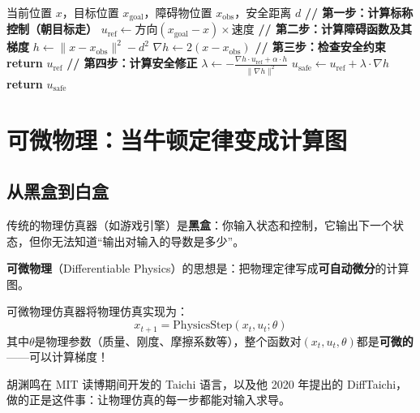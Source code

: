 \begin{algorithm}[H]
\caption{CBF安全控制器伪代码}
\begin{algorithmic}[1]
\Require 当前位置 $x$，目标位置 $x_{\text{goal}}$，障碍物位置 $x_{\text{obs}}$，安全距离 $d$
\State \textbf{// 第一步：计算标称控制（朝目标走）}
\State $u_{\text{ref}} \gets \text{方向}(x_{\text{goal}} - x) \times \text{速度}$
\State \textbf{// 第二步：计算障碍函数及其梯度}
\State $h \gets \|x - x_{\text{obs}}\|^2 - d^2$ 
\State $\nabla h \gets 2(x - x_{\text{obs}})$ 
\State \textbf{// 第三步：检查安全约束}
    \State \textbf{return} $u_{\text{ref}}$ 
\EndIf
\State \textbf{// 第四步：计算安全修正}
\State $\lambda \gets -\frac{\nabla h \cdot u_{\text{ref}} + \alpha \cdot h}{\|\nabla h\|^2}$
\State $u_{\text{safe}} \gets u_{\text{ref}} + \lambda \cdot \nabla h$ 
\State \textbf{return} $u_{\text{safe}}$
\end{algorithmic}
\end{algorithm}

\section{可微物理：当牛顿定律变成计算图}

\subsection{从黑盒到白盒}

传统的物理仿真器（如游戏引擎）是\textbf{黑盒}：你输入状态和控制，它输出下一个状态，但你无法知道“输出对输入的导数是多少”。

\textbf{可微物理}（Differentiable Physics）的思想是：把物理定律写成\textbf{可自动微分}的计算图。

\begin{definition}[可微物理仿真器]
可微物理仿真器将物理仿真实现为：
\begin{equation}
    x_{t+1} = \text{PhysicsStep}(x_t, u_t; \theta)
\end{equation}
其中$\theta$是物理参数（质量、刚度、摩擦系数等），整个函数对$(x_t, u_t, \theta)$都是\textbf{可微的}——可以计算梯度！
\end{definition}
胡渊鸣在 MIT 读博期间开发的 Taichi 语言，以及他 2020 年提出的 DiffTaichi，做的正是这件事：让物理仿真的每一步都能对输入求导。

